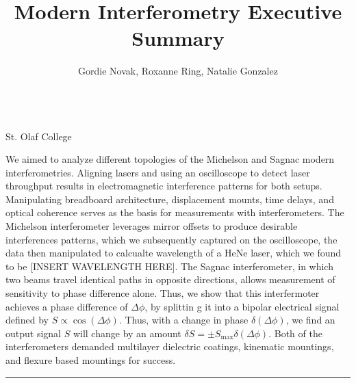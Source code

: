\documentclass[fontsize=10pt]{article}
\title{\centering
\Large Modern Interferometry Executive Summary \\
[10pt] 
}
\author{\centering  Gordie Novak, Roxanne Ring, Natalie Gonzalez}
\makeatletter
\renewenvironment{abstract} %
 {\small
  \begin{center}
  \bfseries \abstractname\vspace{-.5em}\vspace{0pt}
  \end{center}
  \list{}{%
    \setlength{\leftmargin}{0mm}
    \setlength{\rightmargin}{\leftmargin}%
  }
  \item\relax}
 {\endlist}
\renewcommand{\maketitle}{\bgroup\setlength{\parindent}{0pt} %
\begin{flushleft}
  \textbf{\@title}
  \@author \\ 
  \@date
\end{flushleft}\egroup
}
\renewcommand{\maketitle}{\bgroup
\setlength{\parindent}{0pt} %
\begin{flushleft}
  \textbf{\@title}
  \vspace{0.5em}
  \@author \\
  \vspace{1em}
  St. Olaf College
  \vspace{1em}
  
\end{flushleft}\egroup
}
\makeatother
\begin{document}
\maketitle

\begin{abstract}

We aimed to analyze different topologies of the Michelson and Sagnac modern interferometries. Aligning lasers and using an oscilloscope to detect laser throughput results in electromagnetic interference patterns for both setups. Manipulating breadboard architecture, displacement mounts, time delays, and optical coherence serves as the basis for measurements with interferometers. The Michelson interferometer leverages mirror offsets to produce desirable interferences patterns, which we subsequently captured on the oscilloscope, the data then manipulated to calcualte wavelength of a HeNe laser, which we found to be [INSERT WAVELENGTH HERE]. The Sagnac interferometer, in which two beams travel identical paths in opposite directions, allows measurement of sensitivity to phase difference alone. Thus, we show that this interfermoter achieves a phase difference of $\Delta\phi$, by splittin g it into a bipolar electrical signal defined by $S \propto \cos(\Delta\phi)$. Thus, with a change in phase $\delta(\Delta\phi)$, we find an output signal $S$ will change by an amount $\delta S = \pm S_\text{max}\delta(\Delta\phi)$. Both of the interferometers demanded multilayer dielectric coatings, kinematic mountings, and flexure based mountings for success.
     
    
\end{abstract}

\rule{\linewidth}{0.5pt}
\end{document}
